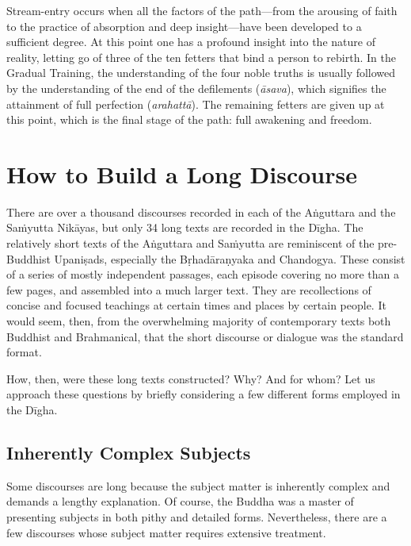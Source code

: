 \documentclass[12pt,openany]{book}%
\begin{document}
Stream-entry occurs when all the factors of the path—from the arousing of faith to the practice of absorption and deep insight—have been developed to a sufficient degree. At this point one has a profound insight into the nature of reality, letting go of three of the ten fetters that bind a person to rebirth. In the Gradual Training, the understanding of the four noble truths is usually followed by the understanding of the end of the defilements (\textit{\textsanskrit{āsava}}), which signifies the attainment of full perfection (\textit{\textsanskrit{arahattā}}). The remaining fetters are given up at this point, which is the final stage of the path: full awakening and freedom.

\section*{How to Build a Long Discourse}

There are over a thousand discourses recorded in each of the \textsanskrit{Aṅguttara} and the \textsanskrit{Saṁyutta} \textsanskrit{Nikāyas}, but only 34 long texts are recorded in the \textsanskrit{Dīgha}. The relatively short texts of the \textsanskrit{Aṅguttara} and \textsanskrit{Saṁyutta} are reminiscent of the pre-Buddhist \textsanskrit{Upaniṣads}, especially the \textsanskrit{Bṛhadāraṇyaka} and Chandogya. These consist of a series of mostly independent passages, each episode covering no more than a few pages, and assembled into a much larger text. They are recollections of concise and focused teachings at certain times and places by certain people. It would seem, then, from the overwhelming majority of contemporary texts both Buddhist and Brahmanical, that the short discourse or dialogue was the standard format.

How, then, were these long texts constructed? Why? And for whom? Let us approach these questions by briefly considering a few different forms employed in the \textsanskrit{Dīgha}.

\subsection*{Inherently Complex Subjects}

Some discourses are long because the subject matter is inherently complex and demands a lengthy explanation. Of course, the Buddha was a master of presenting subjects in both pithy and detailed forms. Nevertheless, there are a few discourses whose subject matter requires extensive treatment.
\end{document}
